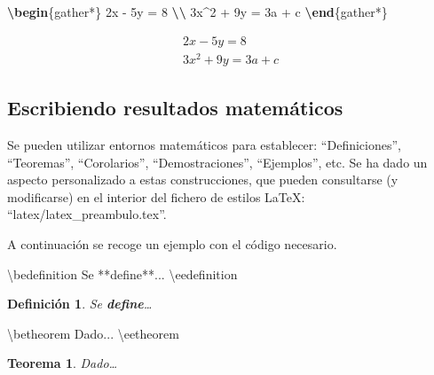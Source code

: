 \documentclass[12pt,a4paper,]{book}
\newenvironment{Shaded}{\begin{snugshade}}{\end{snugshade}}
\newcommand{\ExtensionTok}[1]{#1}
\newcommand{\KeywordTok}[1]{\textcolor[rgb]{0.13,0.29,0.53}{\textbf{#1}}}
\newcommand{\NormalTok}[1]{#1}
\newcommand{\SpecialCharTok}[1]{\textcolor[rgb]{0.81,0.36,0.00}{\textbf{#1}}}
\newcommand{\SpecialStringTok}[1]{\textcolor[rgb]{0.31,0.60,0.02}{#1}}
\newcounter{dummy}
\numberwithin{dummy}{section}
\theoremstyle{ocrenumbox}
\newtheorem{theoremeT}[dummy]{Teorema}  %
\theoremstyle{blacknumex}
\theoremstyle{blacknumbox}
\newtheorem{definitionT}{Definición}[section]  %
\theoremstyle{ocrenum}
\newenvironment{theorem}{\begin{tBox}\begin{theoremeT}}{\end{theoremeT}\end{tBox}}
\newenvironment{definition}{\begin{dBox}\begin{definitionT}}{\end{definitionT}\end{dBox}}
\theoremstyle{ocrenum}
\newcommand{\betheorem}{\begin{theorem}}
\newcommand{\eetheorem}{\end{theorem}}
\newcommand{\bedefinition}{\begin{definition}}
\newcommand{\eedefinition}{\end{definition}}
\begin{document}
\begin{Shaded}
\begin{Highlighting}[]
\KeywordTok{\textbackslash{}begin}\NormalTok{\{}\ExtensionTok{gather*}\NormalTok{\}}\SpecialStringTok{ }
\SpecialStringTok{2x {-} 5y =  8 }\SpecialCharTok{\textbackslash{}\textbackslash{}}\SpecialStringTok{ }
\SpecialStringTok{3x\^{}2 + 9y =  3a + c}
\KeywordTok{\textbackslash{}end}\NormalTok{\{}\ExtensionTok{gather*}\NormalTok{\}}
\end{Highlighting}
\end{Shaded}

\begin{gather*} 
2x - 5y =  8 \\ 
3x^2 + 9y =  3a + c
\end{gather*}

\hypertarget{escribiendo-resultados-matemuxe1ticos}{%
\subsection{Escribiendo resultados
matemáticos}\label{escribiendo-resultados-matemuxe1ticos}}

Se pueden utilizar entornos matemáticos para establecer:
``Definiciones'', ``Teoremas'', ``Corolarios'', ``Demostraciones'',
``Ejemplos'', etc. Se ha dado un aspecto personalizado a estas
construcciones, que pueden consultarse (y modificarse) en el interior
del fichero de estilos LaTeX: ``latex/latex\_preambulo.tex''.

A continuación se recoge un ejemplo con el código necesario.

\begin{Shaded}
\begin{Highlighting}[]
\NormalTok{\textbackslash{}bedefinition}
\NormalTok{Se **define**... }
\NormalTok{\textbackslash{}eedefinition}
\end{Highlighting}
\end{Shaded}

\bedefinition

Se \textbf{define}\ldots{} \eedefinition

\begin{Shaded}
\begin{Highlighting}[]
\NormalTok{\textbackslash{}betheorem}
\NormalTok{Dado...}
\NormalTok{\textbackslash{}eetheorem}
\end{Highlighting}
\end{Shaded}

\betheorem

Dado\ldots{} \eetheorem
\end{document}
